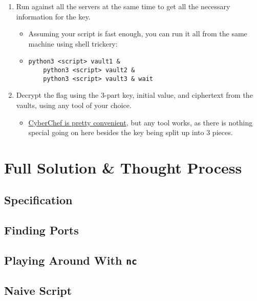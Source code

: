 \documentclass[11pt]{article}
\begin{document}
\begin{enumerate}
\begin{itemize}
        \end{itemize}
        \item Run against all the servers at the same time to get all the necessary information for the key.
        \begin{itemize}
            \item Assuming your script is fast enough, you can run it all from the same machine using shell trickery:
            \item \verb`python3 <script> vault1 &` \\
            \verb`    python3 <script> vault2 &` \\
            \verb`    python3 <script> vault3 & wait`
        \end{itemize}
        \item Decrypt the flag using the 3-part key, initial value, and ciphertext from the vaults, using any tool of your choice.
        \begin{itemize}
            \item \href{https://gchq.github.io/CyberChef}{CyberChef is pretty convenient}, but any tool works, as there is nothing special going on here besides the key being split up into 3 pieces.
        \end{itemize}
    \end{enumerate}


    \section{Full Solution \& Thought Process}\label{sec:full-solution-thought-process}

    \subsection{Specification}\label{subsec:specification}

    \subsection{Finding Ports}\label{subsec:finding-ports}

    \subsection{Playing Around With \texttt{nc}}\label{subsec:playing-around-with-nc}

    \subsection{Naive Script}\label{subsec:naive-script}
\end{document}
